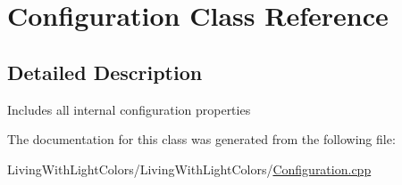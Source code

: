 \hypertarget{class_configuration}{\section{Configuration Class Reference}
\label{class_configuration}
}


\subsection{Detailed Description}
Includes all internal configuration properties 

The documentation for this class was generated from the following file\+:\begin{DoxyCompactItemize}
\item 
Living\+With\+Light\+Colors/\+Living\+With\+Light\+Colors/\hyperlink{_configuration_8cpp}{Configuration.\+cpp}\end{DoxyCompactItemize}
